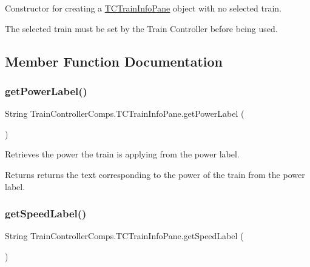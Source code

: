 Constructor for creating a \hyperlink{classTrainControllerComps_1_1TCTrainInfoPane}{T\+C\+Train\+Info\+Pane} object with no selected train. 

The selected train must be set by the Train Controller before being used. 

\subsection{Member Function Documentation}
\mbox{\label{classTrainControllerComps_1_1TCTrainInfoPane_a5c3ebdfe9c6a2d7357a460475e9fd55c}} 
\subsubsection{\texorpdfstring{get\+Power\+Label()}{getPowerLabel()}}
{\footnotesize\ttfamily String Train\+Controller\+Comps.\+T\+C\+Train\+Info\+Pane.\+get\+Power\+Label (\begin{DoxyParamCaption}{ }\end{DoxyParamCaption})}



Retrieves the power the train is applying from the power label. 

\begin{DoxyReturn}{Returns}
returns the text corresponding to the power of the train from the power label. 
\end{DoxyReturn}
\mbox{\label{classTrainControllerComps_1_1TCTrainInfoPane_a9146b41e4efe422586c69624f6e16e2f}} 
\subsubsection{\texorpdfstring{get\+Speed\+Label()}{getSpeedLabel()}}
{\footnotesize\ttfamily String Train\+Controller\+Comps.\+T\+C\+Train\+Info\+Pane.\+get\+Speed\+Label (\begin{DoxyParamCaption}{ }\end{DoxyParamCaption})}




